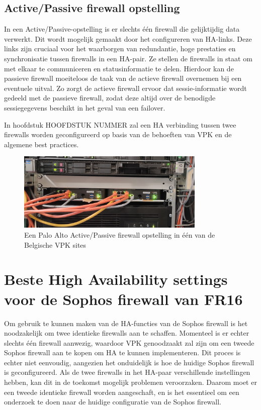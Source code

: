 \subsection{Active/Passive firewall opstelling}

In een Active/Passive-opstelling is er slechts één firewall die gelijktijdig data verwerkt. Dit wordt mogelijk gemaakt door het configureren van HA-links. Deze links zijn cruciaal voor het waarborgen van redundantie, hoge prestaties en synchronisatie tussen firewalls in een HA-pair. Ze stellen de firewalls in staat om met elkaar te communiceren en statusinformatie te delen. Hierdoor kan de passieve firewall moeiteloos de taak van de actieve firewall overnemen bij een eventuele uitval. Zo zorgt de actieve firewall ervoor dat sessie-informatie wordt gedeeld met de passieve firewall, zodat deze altijd over de benodigde sessiegegevens beschikt in het geval van een failover. \autocite{PaloAltoHA2025} \autocite{PaloAltoHAb2025}

In hoofdstuk HOOFDSTUK NUMMER zal een HA verbinding tussen twee firewalls worden geconfigureerd op basis van de behoeften van VPK en de algemene best practices.

\begin{figure}[H]
    \centering
    \includegraphics[width=0.8\textwidth]{fotos/PA_FirewallPairBE02.jpg}
    \caption[Palo Alto ACtive/Passive pair]{\label{fig:grail}Een Palo Alto Active/Passive firewall opstelling in één van de Belgische VPK sites}
\end{figure} 



\section{Beste High Availability settings voor de Sophos firewall van FR16}

Om gebruik te kunnen maken van de HA-functies van de Sophos firewall is het noodzakelijk om twee identieke firewalls aan te schaffen. Momenteel is er echter slechts één firewall aanwezig, waardoor VPK genoodzaakt zal zijn om een tweede Sophos firewall aan te kopen om HA te kunnen implementeren. Dit proces is echter niet eenvoudig, aangezien het onduidelijk is hoe de huidige Sophos firewall is geconfigureerd. Als de twee firewalls in het HA-paar verschillende instellingen hebben, kan dit in de toekomst mogelijk problemen veroorzaken. Daarom moet er een tweede identieke firewall worden aangeschaft, en is het essentieel om een onderzoek te doen naar de huidige configuratie van de Sophos firewall.



